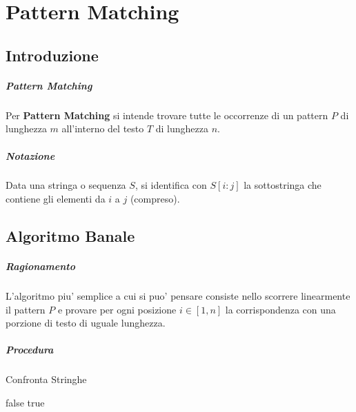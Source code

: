 \chapter{Pattern Matching}

\section{Introduzione}

\paragraph{Pattern Matching}
Per \textbf{Pattern Matching} si intende trovare tutte le occorrenze di un pattern $P$ di lunghezza $m$ all'interno del testo $T$ di lunghezza $n$.

\paragraph{Notazione}

Data una stringa o sequenza $S$, si identifica con $S[i : j]$ la sottostringa che contiene gli elementi da $i$ a $j$ (compreso).

\section{Algoritmo Banale}

\paragraph{Ragionamento}

L'algoritmo piu' semplice a cui si puo' pensare consiste nello scorrere linearmente il pattern $P$ e provare per ogni posizione $i \in [1, n]$ la corrispondenza con una porzione di testo di uguale lunghezza.

\paragraph{Procedura}

\begin{algorithm}
    \renewcommand\thealgorithm{}
    \caption{Confronta Stringhe}
    \begin{algorithmic}
                    \State \Return false
                \EndIf
            \EndFor
            \State \Return true
        \EndProcedure
    \end{algorithmic}
\end{algorithm}

